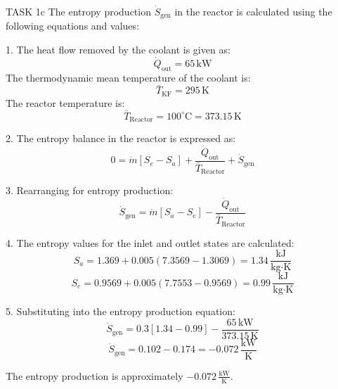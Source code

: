 TASK 1c  
The entropy production \( \dot{S}_{\text{gen}} \) in the reactor is calculated using the following equations and values:

1. The heat flow removed by the coolant is given as:  
\[
\dot{Q}_{\text{out}} = 65 \, \text{kW}
\]  
The thermodynamic mean temperature of the coolant is:  
\[
\bar{T}_{\text{KF}} = 295 \, \text{K}
\]  
The reactor temperature is:  
\[
\bar{T}_{\text{Reactor}} = 100^\circ\text{C} = 373.15 \, \text{K}
\]

2. The entropy balance in the reactor is expressed as:  
\[
0 = \dot{m} \left[ S_e - S_a \right] + \frac{\dot{Q}_{\text{out}}}{\bar{T}_{\text{Reactor}}} + \dot{S}_{\text{gen}}
\]

3. Rearranging for entropy production:  
\[
\dot{S}_{\text{gen}} = \dot{m} \left[ S_a - S_e \right] - \frac{\dot{Q}_{\text{out}}}{\bar{T}_{\text{Reactor}}}
\]

4. The entropy values for the inlet and outlet states are calculated:  
\[
S_a = 1.369 + 0.005 \left( 7.3569 - 1.3069 \right) = 1.34 \, \frac{\text{kJ}}{\text{kg·K}}
\]  
\[
S_e = 0.9569 + 0.005 \left( 7.7553 - 0.9569 \right) = 0.99 \, \frac{\text{kJ}}{\text{kg·K}}
\]

5. Substituting into the entropy production equation:  
\[
\dot{S}_{\text{gen}} = 0.3 \left[ 1.34 - 0.99 \right] - \frac{65 \, \text{kW}}{373.15 \, \text{K}}
\]  
\[
\dot{S}_{\text{gen}} = 0.102 - 0.174 = -0.072 \, \frac{\text{kW}}{\text{K}}
\]  

The entropy production is approximately \( -0.072 \, \frac{\text{kW}}{\text{K}} \).